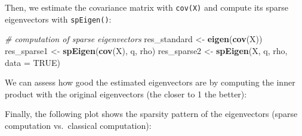 \documentclass[]{article}
\newenvironment{Shaded}{\begin{snugshade}}{\end{snugshade}}
\newcommand{\KeywordTok}[1]{\textcolor[rgb]{0.13,0.29,0.53}{\textbf{#1}}}
\newcommand{\DataTypeTok}[1]{\textcolor[rgb]{0.13,0.29,0.53}{#1}}
\newcommand{\DecValTok}[1]{\textcolor[rgb]{0.00,0.00,0.81}{#1}}
\newcommand{\StringTok}[1]{\textcolor[rgb]{0.31,0.60,0.02}{#1}}
\newcommand{\CommentTok}[1]{\textcolor[rgb]{0.56,0.35,0.01}{\textit{#1}}}
\newcommand{\OtherTok}[1]{\textcolor[rgb]{0.56,0.35,0.01}{#1}}
\newcommand{\OperatorTok}[1]{\textcolor[rgb]{0.81,0.36,0.00}{\textbf{#1}}}
\newcommand{\NormalTok}[1]{#1}
\begin{document}
Then, we estimate the covariance matrix with \texttt{cov(X)} and compute
its sparse eigenvectors with \texttt{spEigen()}:

\begin{Shaded}
\begin{Highlighting}[]
\CommentTok{# computation of sparse eigenvectors}
\NormalTok{res_standard <-}\StringTok{ }\KeywordTok{eigen}\NormalTok{(}\KeywordTok{cov}\NormalTok{(X))}
\NormalTok{res_sparse1 <-}\StringTok{ }\KeywordTok{spEigen}\NormalTok{(}\KeywordTok{cov}\NormalTok{(X), q, rho)}
\NormalTok{res_sparse2 <-}\StringTok{ }\KeywordTok{spEigen}\NormalTok{(X, q, rho, }\DataTypeTok{data =} \OtherTok{TRUE}\NormalTok{)}
\end{Highlighting}
\end{Shaded}

We can assess how good the estimated eigenvectors are by computing the
inner product with the original eigenvectors (the closer to 1 the
better):

\begin{Shaded}
\end{Shaded}

Finally, the following plot shows the sparsity pattern of the
eigenvectors (sparse computation vs.~classical computation):
\end{document}
